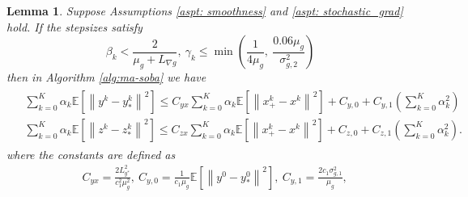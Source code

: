 \documentclass[10pt]{article}
\newtheorem{lemma}{Lemma}[section]
\theoremstyle{remark}
\newcommand{\E}{\mathbb{E}}
\newcommand{\norm}[1]{\left\|#1\right\|}
\begin{document}
\begin{lemma}\label{lem: yz_error}
    Suppose Assumptions \ref{aspt: smoothness} and \ref{aspt: stochastic_grad} hold. If the stepsizes satisfy
    \begin{equation}\label{ineq: beta_gamma_condition_simple}
        \beta_k < \frac{2}{\mu_g + L_{\nabla g}},\ \gamma_k \leq \min\left(\frac{1}{4\mu_g},\ \frac{0.06\mu_g}{\sigma_{g,2}^2}\right)
    \end{equation}
    then in Algorithm \ref{alg:ma-soba} we have
    \begin{align}\label{ineq: yz_decrease_simple}
        \begin{aligned}
            &\sum_{k=0}^{K}\alpha_k\E\left[\norm{y^k - y_*^k}^2\right]\leq C_{yx}\sum_{k=0}^{K}\alpha_k \E\left[\norm{x_+^k - x^k}^2\right] + C_{y,0} + C_{y,1}\left(\sum_{k=0}^{K}\alpha_k^2\right) \\
        &\sum_{k=0}^{K}\alpha_k\E\left[\norm{z^k-z_*^k}^2\right] \leq C_{zx}\sum_{k=0}^{K}\alpha_k \E\left[\norm{x_+^k - x^k}^2\right] + C_{z,0} + C_{z,1}\left(\sum_{k=0}^{K}\alpha_k^2\right).
        \end{aligned}
    \end{align}
    where the constants are defined as
    \begin{align*}
         &C_{yx} = \frac{2L_{y^*}^2}{c_1^2\mu_g^2},\ C_{y,0} = \frac{1}{c_1\mu_g}\E\left[\norm{y^0 - y_*^0}^2\right],\ C_{y,1}=\frac{2c_1\sigma_{g,1}^2}{\mu_g}, \\

\end{align*}
\end{lemma}
\end{document}
